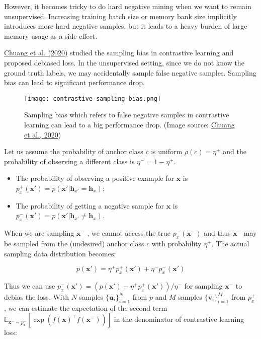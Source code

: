 \documentclass[12pt]{article}
\begin{document}
However, it becomes tricky to do hard negative mining when we want to remain unsupervised. Increasing training batch size or memory bank size implicitly introduces more hard negative samples, but it leads to a heavy burden of large memory usage as a side effect.

\href{https://arxiv.org/abs/2007.00224}{Chuang et al. (2020)} studied the sampling bias in contrastive learning and proposed debiased loss. In the unsupervised setting, since we do not know the ground truth labels, we may accidentally sample false negative samples. Sampling bias can lead to significant performance drop.

\begin{figure}[H]
    \centering
    \texttt{[image: contrastive-sampling-bias.png]}
    \caption{Sampling bias which refers to false negative samples in contrastive learning can lead to a big performance drop. (Image source: \href{https://arxiv.org/abs/2007.00224}{Chuang et al., 2020})}
\end{figure}

Let us assume the probability of anchor class $c$ is uniform $\rho(c)=\eta^+$ and the probability of observing a different class is $\eta^- = 1-\eta^+$.
\begin{itemize}
    \item The probability of observing a positive example for $\mathbf{x}$ is $p^+_x(\mathbf{x}')=p(\mathbf{x}'\vert \mathbf{h}_{x'}=\mathbf{h}_x)$;
    \item The probability of getting a negative sample for $\mathbf{x}$ is $p^-_x(\mathbf{x}')=p(\mathbf{x}'\vert \mathbf{h}_{x'}\neq\mathbf{h}_x)$.
\end{itemize}

When we are sampling $\mathbf{x}^-$ , we cannot access the true $p^-_x(\mathbf{x}^-)$ and thus $\mathbf{x}^-$ may be sampled from the (undesired) anchor class $c$ with probability $\eta^+$. The actual sampling data distribution becomes:

\[
p(\mathbf{x}') = \eta^+ p^+_x(\mathbf{x}') + \eta^- p_x^-(\mathbf{x}')
\]

Thus we can use $p^-_x(\mathbf{x}') = (p(\mathbf{x}') - \eta^+ p^+_x(\mathbf{x}'))/\eta^-$ for sampling $\mathbf{x}^-$ to debias the loss. With $N$ samples $\{\mathbf{u}_i\}^N_{i=1}$ from $p$ and $M$ samples $\{ \mathbf{v}_i \}_{i=1}^M$ from $p^+_x$ , we can estimate the expectation of the second term $\mathbb{E}_{\mathbf{x}^-\sim p^-_x}[\exp(f(\mathbf{x})^\top f(\mathbf{x}^-))]$ in the denominator of contrastive learning loss:
\end{document}
